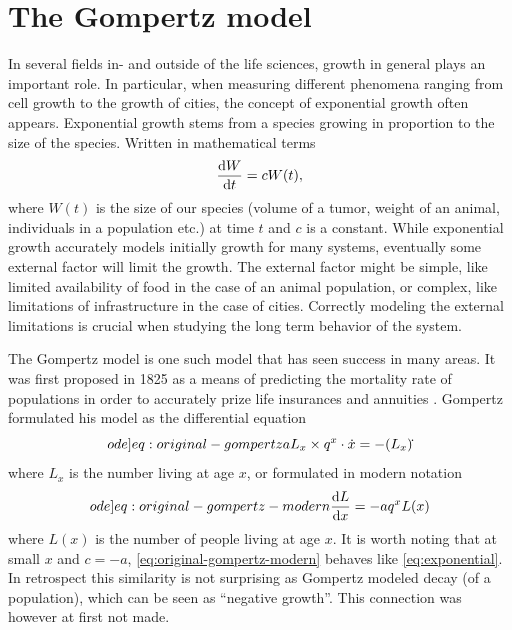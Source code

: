 \section{The Gompertz model}

In several fields in- and outside of the life sciences, growth in general plays an important role.
In particular, when measuring different phenomena ranging from cell growth to the growth of cities, the concept of exponential growth often appears.
Exponential growth stems from a species growing in proportion to the size of the species.
Written in mathematical terms
\begin{equation} \label{eq:exponential}
  \diff{W}{t} = c W(t),
\end{equation}
where \(W(t)\) is the size of our species (volume of a tumor, weight of an animal, individuals in a population etc.) at time \(t\) and \(c\) is a constant.
While exponential growth accurately models initially growth for many systems, eventually some external factor will limit the growth.
The external factor might be simple, like limited availability of food in the case of an animal population, or complex, like limitations of infrastructure in the case of cities. %
Correctly modeling the external limitations is crucial when studying the long term behavior of the system.

The Gompertz model is one such model that has seen success in many areas.
It was first proposed in 1825 as a means of predicting the mortality rate of populations in order to accurately prize life insurances and annuities \cite{gompertz1825nature}.
Gompertz formulated his model as the differential equation
\begin{equation} \label[ode]{eq:original-gompertz}
  a L_x \times q^x \cdot \dot{x} = - (L_x)\dot{}
\end{equation}
where \(L_x\) is the number living at age \(x\), or formulated in modern notation
\begin{equation} \label[ode]{eq:original-gompertz-modern}
  \diff{L}{x} = -a q^x L(x)
\end{equation}
where \(L(x)\) is the number of people living at age \(x\).
It is worth noting that at small \(x\) and \(c = -a\), \cref{eq:original-gompertz-modern} behaves like \cref{eq:exponential}.
In retrospect this similarity is not surprising as Gompertz modeled decay (of a population), which can be seen as \enquote{negative growth}.
This connection was however at first not made.

